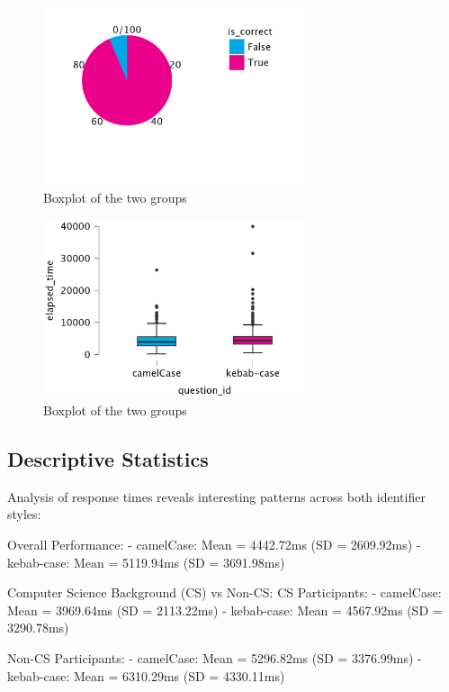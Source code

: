 \documentclass[unicode,11pt,a4paper,oneside,numbers=endperiod,openany]{scrartcl}
\begin{document}
\begin{figure}[h]
    \centering
    \includegraphics[width=0.7\textwidth]{./figures/correct_kebab_noBack.png}
    \caption{Boxplot of the two groups}
    \label{fig:boxplot}
\end{figure}

\begin{figure}[h]
    \centering
    \includegraphics[width=0.7\textwidth]{./figures/elapsed_time_correct.png}
    \caption{Boxplot of the two groups}
    \label{fig:boxplot}
\end{figure}

\subsection{Descriptive Statistics}

Analysis of response times reveals interesting patterns across both identifier styles:

Overall Performance:
- camelCase: Mean = 4442.72ms (SD = 2609.92ms)
- kebab-case: Mean = 5119.94ms (SD = 3691.98ms)

Computer Science Background (CS) vs Non-CS:
CS Participants:
- camelCase: Mean = 3969.64ms (SD = 2113.22ms)
- kebab-case: Mean = 4567.92ms (SD = 3290.78ms)

Non-CS Participants:
- camelCase: Mean = 5296.82ms (SD = 3376.99ms)
- kebab-case: Mean = 6310.29ms (SD = 4330.11ms)
\end{document}
